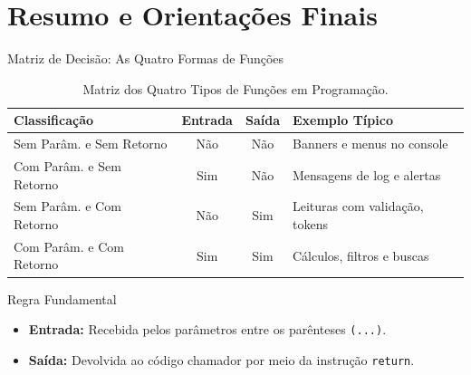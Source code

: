\section{Resumo e Orientações Finais}

\begin{frame}{Matriz de Decisão: As Quatro Formas de Funções}
    \begin{table}
        \centering
        \scriptsize
        \begin{tabular}{lccl}
            \toprule
            \textbf{Classificação} & \textbf{Entrada} & \textbf{Saída} & \textbf{Exemplo Típico} \\
            \midrule
            Sem Parâm. e Sem Retorno & Não & Não & Banners e menus no console \\
            Com Parâm. e Sem Retorno & Sim & Não & Mensagens de log e alertas \\
            Sem Parâm. e Com Retorno & Não & Sim & Leituras com validação, tokens \\
            Com Parâm. e Com Retorno & Sim & Sim & Cálculos, filtros e buscas \\
            \bottomrule
        \end{tabular}
        \caption{Matriz dos Quatro Tipos de Funções em Programação.}
    \end{table}

    \vspace{0.2cm}
    \begin{block}{Regra Fundamental}
        \begin{itemize}
            \item \textbf{Entrada:} Recebida pelos parâmetros entre os parênteses \texttt{(...)}.
            \item \textbf{Saída:} Devolvida ao código chamador por meio da instrução \texttt{return}.
        \end{itemize}
    \end{block}
\end{frame}

